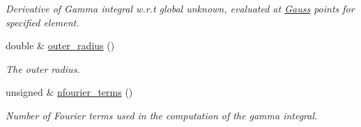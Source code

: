 \begin{DoxyCompactItemize}
\begin{DoxyCompactList}\small\item\em Derivative of Gamma integral w.\+r.\+t global unknown, evaluated at \hyperlink{classoomph_1_1Gauss}{Gauss} points for specified element. \end{DoxyCompactList}\item 
double \& \hyperlink{classoomph_1_1HelmholtzDtNMesh_af7dc865c8a17b22ac3fbe2fe8573b80d}{outer\+\_\+radius} ()
\begin{DoxyCompactList}\small\item\em The outer radius. \end{DoxyCompactList}\item 
unsigned \& \hyperlink{classoomph_1_1HelmholtzDtNMesh_a7d71342179243a29a3b145a975e3d41e}{nfourier\+\_\+terms} ()
\begin{DoxyCompactList}\small\item\em Number of Fourier terms used in the computation of the gamma integral. \end{DoxyCompactList}\end{DoxyCompactItemize}
